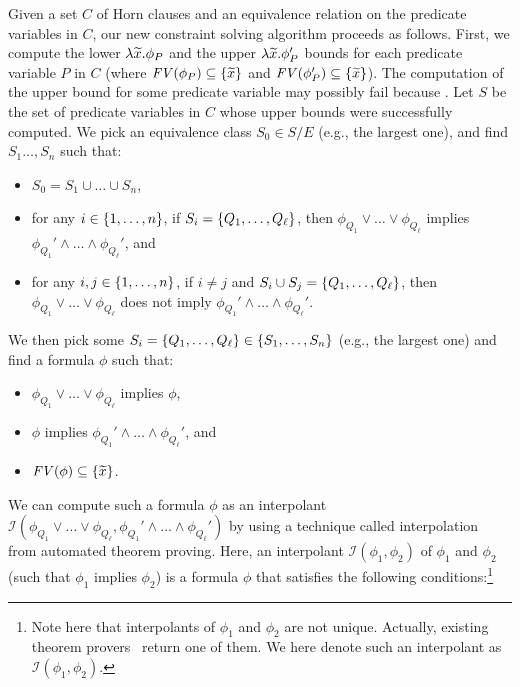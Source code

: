  Given a set \(C\) of 
Horn clauses and an equivalence relation on the predicate variables in 
\(C\), our new constraint solving algorithm proceeds as follows.  First, 
we compute the lower \(\lambda \widetilde{x}.\phi_P\) and the upper \(\lambda 
\widetilde{x}.\phi_P'\) bounds for each predicate variable \(P\) in \(C\) 
(where \(\mathit{FV}({\phi_P}) \subseteq \{{\widetilde{x}}\}\) and \(\mathit{FV}({\phi_P'}) 
\subseteq \{{\widetilde{x}}\}\)).  The computation of the upper bound for some 
predicate variable may possibly fail because \todo{}.  Let \(S\) be the 
set of predicate variables in \(C\) whose upper bounds were successfully 
computed.  We pick an equivalence class \(S_0 \in S / E\) (e.g., the 
largest one), and find \(S_1\dots,S_n\) such that:
\begin{itemize}
\item \(S_0 = S_1 \cup \dots \cup S_n\),
\item for any \(i \in \{{1,\dots,n}\}\), if \(S_i = 
\{{Q_1,\dots,Q_{\ell}}\}\), then \(\phi_{Q_1} \lor \dots \lor 
\phi_{Q_{\ell}}\) implies \(\phi_{Q_1}' \land \dots \land 
\phi_{Q_{\ell}}'\), and
\item for any \(i,j \in \{{1,\dots,n}\}\), if \(i \neq j\) and 
\(S_i \cup S_j = \{{Q_1,\dots,Q_{\ell}}\}\), then \(\phi_{Q_1} \lor 
\dots \lor \phi_{Q_{\ell}}\) does not imply \(\phi_{Q_1}' \land \dots 
\land \phi_{Q_{\ell}}'\).
\end{itemize}
We then pick some \(S_i = \{{Q_1,\dots,Q_{\ell}}\} \in 
\{{S_1,\dots,S_n}\}\) (e.g., the largest one) and find a formula \(\phi\) 
such that:
\begin{itemize}
\item \(\phi_{Q_1} \lor \dots \lor \phi_{Q_{\ell}}\) implies \(\phi\),
\item \(\phi\) implies \(\phi_{Q_1}' \land \dots \land \phi_{Q_{\ell}}'\), and
\item \(\mathit{FV}({\phi}) \subseteq \{{\widetilde{x}}\}\).
\end{itemize}
We can compute such a formula \(\phi\) as an interpolant 
\(\mathcal{I}(\phi_{Q_1} \lor \dots \lor \phi_{Q_{\ell}},\phi_{Q_1}' 
\land \dots \land \phi_{Q_{\ell}}')\) by using a technique called 
interpolation~\cite{Henzinger2004,McMillan2005} from automated theorem 
proving.  Here, an interpolant \(\mathcal{I}(\phi_1,\phi_2)\) of 
\(\phi_1\) and \(\phi_2\) (such that \(\phi_1\) implies \(\phi_2\)) is a 
formula \(\phi\) that satisfies the following conditions:\footnote{Note 
here that interpolants of \(\phi_1\) and \(\phi_2\) are not unique.  
Actually, existing theorem 
provers~\cite{Henzinger2004,McMillan2005,Beyer2008} return one of them.  
We here denote such an interpolant as \(\mathcal{I}(\phi_1,\phi_2)\).}
